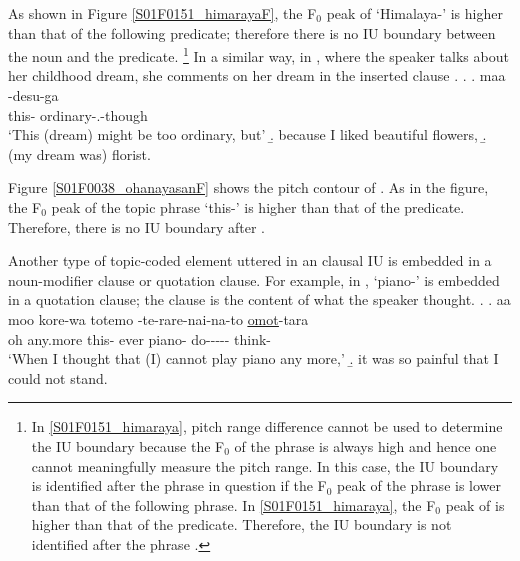 As shown in Figure \ref{S01F0151_himarayaF},
the F$_{0}$ peak of  `Himalaya-' is higher than
that of the following predicate;
therefore there is no IU boundary between the noun and the predicate.%
	\footnote{
	In \ref{S01F0151_himaraya}, pitch range difference cannot be used
	to determine the IU boundary
	because the F$_{0}$ of the phrase  is always high
	and hence one cannot meaningfully measure the pitch range.
	In this case, the IU boundary is identified after the phrase in question
	if the F$_{0}$ peak of the phrase is lower than that of the following phrase.
	In \ref{S01F0151_himaraya}, the F$_{0}$ peak of  is higher than that of the predicate.
	Therefore, the IU boundary is not identified after the phrase 
	\cite[see][p.~420 ff.]{igarashietal06}.
	}
In a similar way,
in \Next, where the speaker talks about her childhood dream,
she comments on her dream in the inserted clause \Next[a].
%
\ex.\label{S01F0038_ohanayasan}
 \ag. maa  -desu-ga \tp{\dvline} \\
 		 this- ordinary-.-though {} \\
		`This (dream) might be too ordinary, but'
 \b. because I liked beautiful flowers,
 \b. (my dream was) florist.

Figure \ref{S01F0038_ohanayasanF} shows the pitch contour of \Last[a].
As in the figure,
the F$_{0}$ peak of the topic phrase  `this-' is higher than that of the predicate.
Therefore, there is no IU boundary after .

Another type of topic-coded element uttered in an clausal IU is
embedded in a noun-modifier clause or quotation clause.
For example, in \Next[a],
 `piano-' is embedded in a quotation clause;
the clause is the content of what the speaker thought.
%
\ex.\label{S00F0209_piano}
 \ag. aa moo \tp{\dvline} kore-wa totemo  -te-rare-nai-na-to \ul{\ul{omot}}-tara \tp{\dvline} \\
 	oh any.more {} this- ever piano- do----- think- {} \\
	`When I thought that (I) cannot play piano any more,'
 \b. it was so painful that I could not stand.


